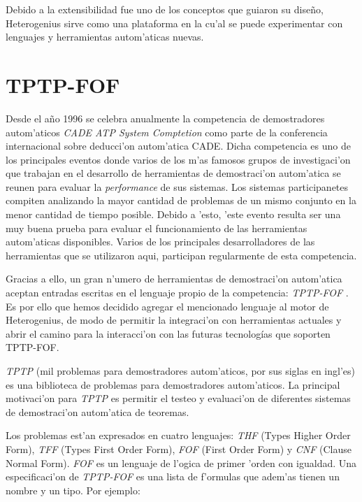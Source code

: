Debido a la extensibilidad fue uno de los conceptos que guiaron su diseño, Heterogenius sirve como  una plataforma en la cu'al se puede experimentar con lenguajes y herramientas autom'aticas nuevas.


\section{TPTP-FOF}
\label{capitulo:TPTP-FOF}

Desde el a\~no 1996 se celebra anualmente la competencia de demostradores autom'aticos \emph{CADE ATP System Comptetion} \cite{casc} como parte de la conferencia internacional sobre deducci'on autom'atica CADE.
Dicha competencia es uno de los principales eventos donde varios de los m'as famosos grupos de investigaci'on que trabajan en el desarrollo de herramientas de demostraci'on autom'atica se reunen para evaluar la \emph{performance} de sus sistemas. Los sistemas participanetes compiten analizando la mayor cantidad de problemas de un mismo conjunto en la menor cantidad de tiempo posible. Debido a 'esto, 'este evento resulta ser una muy buena prueba para evaluar el funcionamiento de las herramientas autom'aticas disponibles. Varios de los principales desarrolladores de las herramientas que se utilizaron aqui, participan regularmente de esta competencia.

Gracias a ello, un gran n'umero de herramientas de demostraci'on autom'atica aceptan entradas escritas en el lenguaje propio de la competencia: \textit{TPTP-FOF} \cite{fof}. Es por ello que hemos decidido agregar el mencionado lenguaje al motor de Heterogenius, de modo de permitir la integraci'on con herramientas actuales y abrir el camino para la interacci'on con las futuras tecnologías que soporten TPTP-FOF.

\textit{TPTP} (mil problemas para demostradores autom'aticos, por sus siglas en ingl'es) \cite{tptp} es una biblioteca de problemas para demostradores autom'aticos. La principal motivaci'on para \textit{TPTP} es permitir el testeo y evaluaci'on de diferentes sistemas de demostraci'on autom'atica de teoremas.

Los problemas est'an expresados en cuatro lenguajes: \textit{THF} (Types Higher Order Form), \textit{TFF} (Types First Order Form), \textit{FOF} (First Order Form) y \textit{CNF} (Clause Normal Form). \textit{FOF} \cite{fof} es un lenguaje de l'ogica de primer 'orden con igualdad. Una especificaci'on de \textit{TPTP-FOF} es una lista de f'ormulas que adem'as tienen un nombre y un tipo. Por ejemplo:

